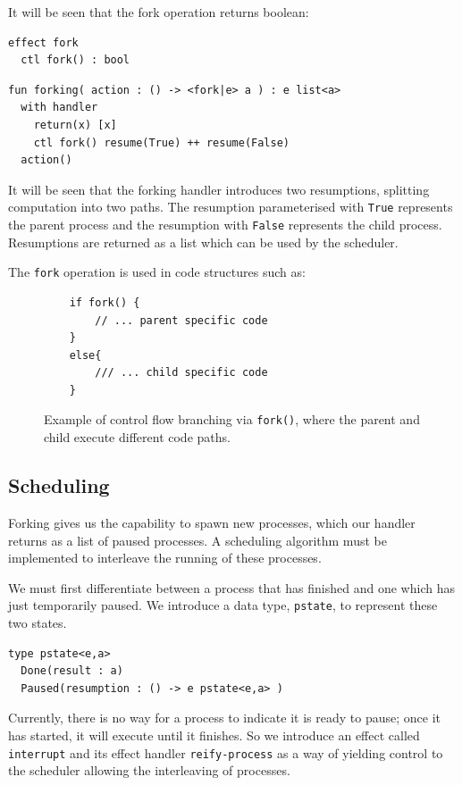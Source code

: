 \documentclass[logo,bsc,singlespacing,parskip]{infthesis}
\begin{document}
It will be seen that the fork operation returns boolean:
\begin{lstlisting}
effect fork
  ctl fork() : bool     

\end{lstlisting}

\begin{lstlisting}
fun forking( action : () -> <fork|e> a ) : e list<a>
  with handler
    return(x) [x]
    ctl fork() resume(True) ++ resume(False)
  action()
\end{lstlisting}

It will be seen that the forking handler introduces two resumptions, splitting computation into two paths. The resumption parameterised with \lstinline{True} represents the parent process and the resumption with \lstinline{False} represents the child process. Resumptions are returned as a list which can be used by the scheduler. 

The \lstinline{fork} operation is used in code structures such as:
\vspace{-1em}
\begin{figure}[H]
    \centering
    \begin{lstlisting}
    if fork() {
        // ... parent specific code
    }
    else{
        /// ... child specific code
    }
    \end{lstlisting}
    \caption{Example of control flow branching via \texttt{fork()}, where the parent and child execute different code paths.}
\end{figure}


\subsection{Scheduling}
Forking gives us the capability to spawn new processes, which our handler returns as a list of paused processes. A scheduling algorithm must be implemented to interleave the running of these processes.

We must first differentiate between a process that has finished and one which has just temporarily paused. We introduce a data type, \lstinline{pstate}, to represent these two states.
\begin{lstlisting}
type pstate<e,a>
  Done(result : a)
  Paused(resumption : () -> e pstate<e,a> )
\end{lstlisting}

Currently, there is no way for a process to indicate it is ready to pause; once it has started, it will execute until it finishes. So we introduce an effect called \lstinline{interrupt} and its effect handler \lstinline{reify-process} as a way of yielding control to the scheduler allowing the interleaving of processes.
\end{document}
